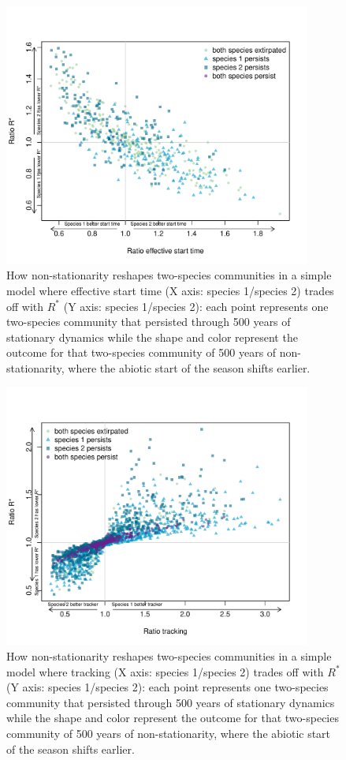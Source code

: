 \documentclass[11pt,letter]{article}
\begin{document}
\begin{figure}[t!]
\centering
\includegraphics[width=0.9\textwidth]{..//..//..//R/graphs/modelruns/manuscript/tauIPrstart1.pdf}
\caption{How non-stationarity reshapes two-species communities in a simple model where effective start time (X axis: species 1/species 2) trades off with $R^*$ (Y axis: species 1/species 2): each point represents one two-species community that persisted through 500 years of stationary dynamics while the shape and color represent the outcome for that two-species community of 500 years of non-stationarity, where the abiotic start of the season shifts earlier.}
 \label{fig:tauirstarsupp}
\end{figure}
\fi

\begin{figure}[t!]
\centering
\includegraphics[width=0.9\textwidth]{..//..//..//R/graphs/modelruns/manuscript/alpharstar.pdf}
\caption{How non-stationarity reshapes two-species communities in a simple model where tracking (X axis: species 1/species 2) trades off with $R^*$ (Y axis: species 1/species 2): each point represents one two-species community that persisted through 500 years of stationary dynamics while the shape and color represent the outcome for that two-species community of 500 years of non-stationarity, where the abiotic start of the season shifts earlier.}
\label{fig:alpharstarsupp}
\end{figure}
\end{document}
